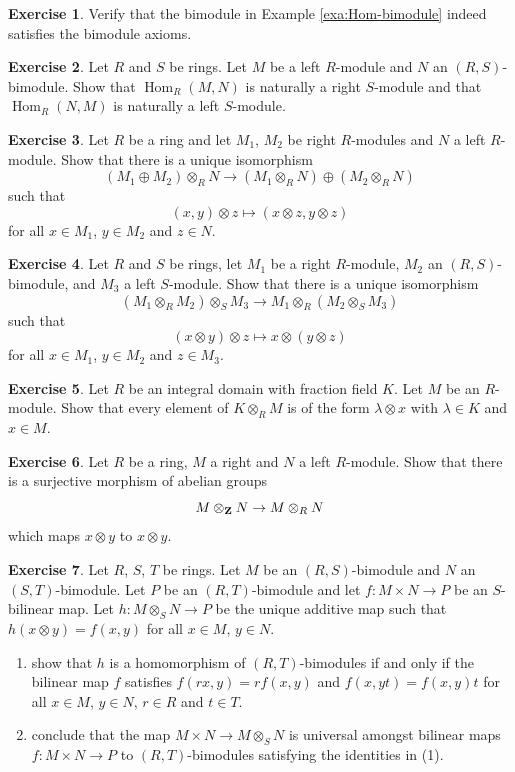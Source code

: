 \documentclass[11pt]{amsbook}
\DeclareMathOperator\Hom{Hom}
\theoremstyle{plain}
\theoremstyle{definition}
\newtheorem{exercise}{Exercise}
\begin{document}
\begin{exercise}Verify that the bimodule in Example \ref{exa:Hom-bimodule} indeed satisfies the bimodule axioms.
\end{exercise}

\begin{exercise}\label{exc:hom-bimodule}
Let $R$ and $S$ be rings. Let $M$ be a left $R$-module and $N$ an $(R,S)$-bimodule. Show that $\Hom_R(M,N)$ is naturally a right $S$-module and that $\Hom_R(N,M)$ is naturally a left $S$-module.
\end{exercise}


\begin{exercise}
Let $R$ be a ring and let $M_1$, $M_2$ be right $R$-modules and $N$ a left $R$-module. Show that there is a unique isomorphism
\[
	 (M_1\oplus M_2) \otimes_R N \to (M_1\otimes_R N) \oplus (M_2 \otimes_R N)
\]
such that 
\[
	(x,y)\otimes z \mapsto (x\otimes z, y\otimes z)
\]
for all $x\in M_1$, $y\in M_2$ and $z\in N$.
\end{exercise}


\begin{exercise}
Let $R$ and $S$ be rings, let $M_1$ be a right $R$-module, $M_2$ an $(R,S)$-bimodule, and $M_3$ a left $S$-module. Show that there is a unique isomorphism
\[
	 (M_1\otimes_R M_2) \otimes_S M_3 \to M_1 \otimes_R (M_2 \otimes_S M_3)
\]
such that 
\[
	(x\otimes y)\otimes z \mapsto x\otimes(y\otimes z)
\]
for all $x\in M_1$, $y\in M_2$ and $z\in M_3$.
\end{exercise}



\begin{exercise}
Let $R$ be an integral domain with fraction field $K$. Let $M$  be an $R$-module. Show that every element of $K\otimes_R M$ is of the form $\lambda\otimes x$ with $\lambda \in K$ and $x\in M$.
\end{exercise}


\begin{exercise}
Let $R$ be a ring, $M$ a right and $N$ a left $R$-module. Show that there is a surjective morphism of 
abelian groups
\[
	M\otimes_{\mathbf{Z}} N \to M\otimes_R N
\]
which maps $x\otimes y$ to $x\otimes y$. 
\end{exercise}

\begin{exercise}
Let $R$, $S$, $T$ be rings. Let $M$ be an $(R,S)$-bimodule and $N$ an $(S,T)$-bimodule. Let $P$ be an $(R,T)$-bimodule and let $f\colon M\times N\to P$ be an $S$-bilinear map. Let $h\colon M\otimes_S N \to P$ be the unique additive map such that $h(x\otimes y)=f(x,y)$ for all $x\in M$, $y\in N$. 
\begin{enumerate}
\item show that $h$ is a homomorphism of $(R,T)$-bimodules if and only if the bilinear map $f$ satisfies $f(rx,y) = rf(x,y)$ and $f(x,yt) = f(x,y)t$ for all $x\in M$, $y\in N$, $r\in R$ and $t \in T$. 
\item conclude that the map $M\times N \to M\otimes_S N$ is universal amongst bilinear maps $f\colon M\times N \to P$ to $(R,T)$-bimodules satisfying the identities in (1). 
\end{enumerate}
\end{exercise}
\end{document}
